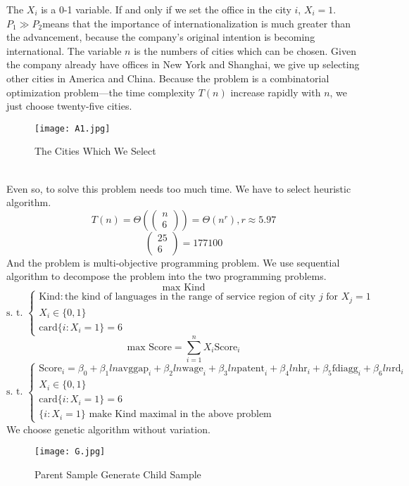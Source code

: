 \documentclass{mcmthesis}
\begin{document}
\indent The \(X_i\) is a 0-1 variable. If and only if we set the office in the city \(i\), \(X_i=1\). \(P_1\gg P_2\)means that the importance of internationalization is much greater than the advancement, because the company's original intention is becoming international. The variable \(n\) is the numbers of cities which can be chosen. Given the company already have offices in New York and Shanghai, we give up selecting other cities in America and China. Because the problem is a combinatorial optimization problem---the time complexity \(T(n)\) increase rapidly with \(n\), we just choose twenty-five cities. 
\begin{figure}[htbp]
\centering
\texttt{[image: A1.jpg]}
\caption{The Cities Which We Select}
\end{figure}\\
Even so, to solve this problem needs too much time. We have to select heuristic algorithm.\\
\[T(n)=\Theta(\left(
\begin{matrix}
n\\
6
\end{matrix}\right))=\Theta(n^r), r\approx5. 97\]
\[\left(
\begin{matrix}
25\\
6
\end{matrix}\right)=177100\]
And the problem is multi-objective programming problem. We use sequential algorithm to decompose the problem into the two programming problems.
\[\textrm{max }\textrm{Kind}\]
\[\textrm{s. t. }\left\{
\begin{array}{l}
\textrm{Kind}: \textrm{the kind of languages in the range of service region of city }j\textrm{ for }X_j=1\\
X_i\in\{0, 1\}\\
\textrm{card}\{i: X_i=1\}=6
\end{array}\right. \]
\[\textrm{max Score}=\sum\limits_{i=1}^{n}X_i\textrm{Score}_i\]
\[\textrm{s. t. }\left\{
\begin{array}{l}
\textrm{Score}_i=\beta_0+\beta_1ln\textrm{avggap}_i+\beta_2ln\textrm{wage}_i+\beta_3ln\textrm{patent}_i+\beta_4ln\textrm{hr}_i+\beta_5\textrm{fdiagg}_i+\beta_6ln\textrm{rd}_i\\
X_i\in\{0, 1\}\\
\textrm{card}\{i: X_i=1\}=6\\
\{i: X_i=1\}\textrm{ make Kind maximal in the above problem}
\end{array}\right. \]
We choose genetic algorithm without variation. 
\begin{figure}[htbp]
\centering
\texttt{[image: G.jpg]}
\caption{Parent Sample Generate Child Sample}
\end{figure}
\end{document}
